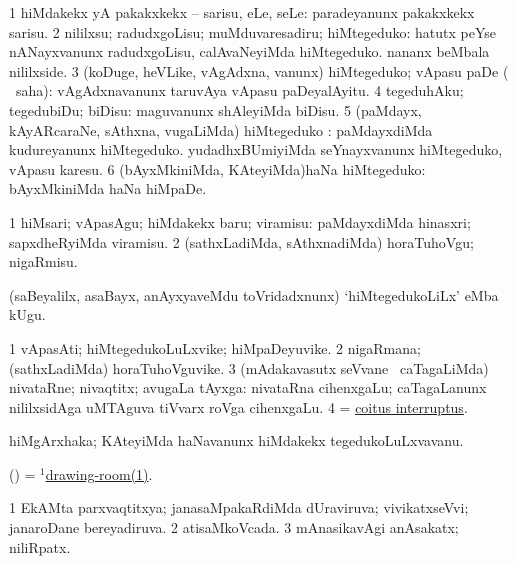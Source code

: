 \bentry
{} 
\gl{\sakirx}
\expl{}
\bmng
\bnum
\num{1} hiMdakekx yA pakakxkekx -- sarisu, eLe, seLe:  paradeyanunx pakakxkekx sarisu. 
\num{2} nililxsu; radudxgoLisu; muMduvaresadiru; hiMtegeduko:  hatutx peYse nANayxvanunx radudxgoLisu, calAvaNeyiMda hiMtegeduko.  nananx beMbala nililxside. 
\num{3} (koDuge, heVLike, vAgAdxna, \mo vanunx) hiMtegeduko; vApasu paDe ( \akirx\ saha):  vAgAdxnavanunx taruvAya vApasu paDeyalAyitu. 
\num{4} tegeduhAku; tegedubiDu; biDisu:  maguvanunx shAleyiMda biDisu. 
\num{5} (paMdayx, kAyARcaraNe, sAthxna, \mo vugaLiMda) hiMtegeduko :  paMdayxdiMda kudureyanunx hiMtegeduko.  yudadhxBUmiyiMda seYnayxvanunx hiMtegeduko, vApasu karesu. 
\num{6} (bAyxMkiniMda, KAteyiMda)haNa hiMtegeduko:  bAyxMkiniMda haNa hiMpaDe. 
\enum
\emng

\noindent
\gl{\akirx}
\expl{}
\bmng
\bnum
\num{1} hiMsari; vApasAgu; hiMdakekx baru; viramisu:  paMdayxdiMda hinasxri; sapxdheRyiMda viramisu. 
\num{2} (sathxLadiMda, sAthxnadiMda) horaTuhoVgu; nigaRmisu. 
\enum
\emng

\noindent
\gl{\pagu}
\expl{}
\bmng
{} (saBeyalilx, asaBayx, anAyxyaveMdu toVridadxnunx) `hiMtegedukoLiLx' eMba kUgu. 
\emng
\eentry

\bentry 
{} 
\gl{\nA}
\expl{}
\bmng
\bnum
\num{1} vApasAti; hiMtegedukoLuLxvike; hiMpaDeyuvike. 
\num{2} nigaRmana; (sathxLadiMda) horaTuhoVguvike. 
\num{3} (mAdakavasutx seVvane \mo\ caTagaLiMda) nivataRne; nivaqtitx; avugaLa tAyxga:  nivataRna cihenxgaLu; caTagaLanunx nililxsidAga uMTAguva tiVvarx roVga cihenxgaLu. 
\num{4} = \hyperref{kandict_c.pdf}{C}{coitus interruptus}{coitus interruptus}. 
\enum
\emng
\eentry

\bentry
{} 
\gl{\nA}
\expl{}
\bmng
hiMgArxhaka; KAteyiMda haNavanunx hiMdakekx tegedukoLuLxvavanu. 
\emng
\eentry

\bentry
{} 
\gl{\nA}
\bmng
(\pArxparx) = \hyperref{kandict_d.pdf}{D}{drawing-room(1)}{$^1$drawing-room(1)}. 
\emng
\eentry

\bentry
{} 
\gl{\gu}
\expl{}
\bmng
\bnum
\num{1} EkAMta parxvaqtitxya; janasaMpakaRdiMda dUraviruva; vivikatxseVvi; janaroDane bereyadiruva. 
\num{2} atisaMkoVcada. 
\num{3} mAnasikavAgi anAsakatx; niliRpatx. 
\enum
\emng
\eentry


